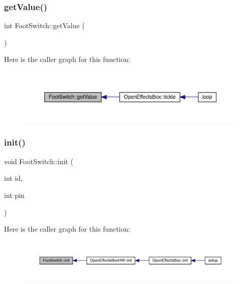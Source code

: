 \mbox{\label{class_foot_switch_ae93d6b174a73840c5b4d978435d58114}} 
\subsubsection{\texorpdfstring{get\+Value()}{getValue()}}
{\footnotesize\ttfamily int Foot\+Switch\+::get\+Value (\begin{DoxyParamCaption}{ }\end{DoxyParamCaption})}

Here is the caller graph for this function\+:\nopagebreak
\begin{figure}[H]
\begin{center}
\leavevmode
\includegraphics[width=350pt]{class_foot_switch_ae93d6b174a73840c5b4d978435d58114_icgraph}
\end{center}
\end{figure}
\mbox{\label{class_foot_switch_af9db72b8850c90fcd857aa97cdc6cc33}} 
\subsubsection{\texorpdfstring{init()}{init()}}
{\footnotesize\ttfamily void Foot\+Switch\+::init (\begin{DoxyParamCaption}\item[{int}]{id,  }\item[{int}]{pin }\end{DoxyParamCaption})}

Here is the caller graph for this function\+:\nopagebreak
\begin{figure}[H]
\begin{center}
\leavevmode
\includegraphics[width=350pt]{class_foot_switch_af9db72b8850c90fcd857aa97cdc6cc33_icgraph}
\end{center}
\end{figure}
\mbox{\label{class_foot_switch_a3bda23682bf3dc91fefa3efa98e9cd1f}} 
